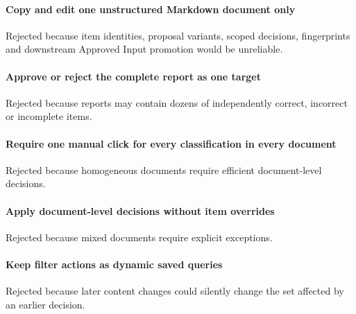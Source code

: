 \hypertarget{copy-and-edit-one-unstructured-markdown-document-only}{%
\paragraph{Copy and edit one unstructured Markdown document only}\label{copy-and-edit-one-unstructured-markdown-document-only}}

Rejected because item identities, proposal variants, scoped decisions, fingerprints and downstream Approved Input promotion would be unreliable.

\hypertarget{approve-or-reject-the-complete-report-as-one-target}{%
\paragraph{Approve or reject the complete report as one target}\label{approve-or-reject-the-complete-report-as-one-target}}

Rejected because reports may contain dozens of independently correct, incorrect or incomplete items.

\hypertarget{require-one-manual-click-for-every-classification-in-every-document}{%
\paragraph{Require one manual click for every classification in every document}\label{require-one-manual-click-for-every-classification-in-every-document}}

Rejected because homogeneous documents require efficient document-level decisions.

\hypertarget{apply-document-level-decisions-without-item-overrides}{%
\paragraph{Apply document-level decisions without item overrides}\label{apply-document-level-decisions-without-item-overrides}}

Rejected because mixed documents require explicit exceptions.

\hypertarget{keep-filter-actions-as-dynamic-saved-queries}{%
\paragraph{Keep filter actions as dynamic saved queries}\label{keep-filter-actions-as-dynamic-saved-queries}}

Rejected because later content changes could silently change the set affected by an earlier decision.

